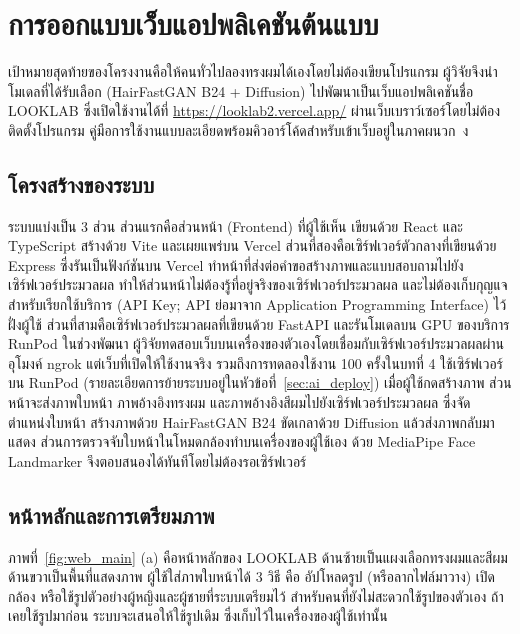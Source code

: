 \section{การออกแบบเว็บแอปพลิเคชันต้นแบบ}
\label{sec:webapp}

เป้าหมายสุดท้ายของโครงงานคือให้คนทั่วไปลองทรงผมได้เองโดยไม่ต้องเขียนโปรแกรม
ผู้วิจัยจึงนำโมเดลที่ได้รับเลือก (HairFastGAN B24 + Diffusion) ไปพัฒนาเป็นเว็บแอปพลิเคชันชื่อ LOOKLAB
ซึ่งเปิดใช้งานได้ที่ \url{https://looklab2.vercel.app/} ผ่านเว็บเบราว์เซอร์โดยไม่ต้องติดตั้งโปรแกรม
คู่มือการใช้งานแบบละเอียดพร้อมคิวอาร์โค้ดสำหรับเข้าเว็บอยู่ในภาคผนวก~ง

\subsection{โครงสร้างของระบบ}

ระบบแบ่งเป็น 3 ส่วน ส่วนแรกคือส่วนหน้า (Frontend) ที่ผู้ใช้เห็น
เขียนด้วย React และ TypeScript สร้างด้วย Vite และเผยแพร่บน Vercel
ส่วนที่สองคือเซิร์ฟเวอร์ตัวกลางที่เขียนด้วย Express ซึ่งรันเป็นฟังก์ชันบน Vercel
ทำหน้าที่ส่งต่อคำขอสร้างภาพและแบบสอบถามไปยังเซิร์ฟเวอร์ประมวลผล
ทำให้ส่วนหน้าไม่ต้องรู้ที่อยู่จริงของเซิร์ฟเวอร์ประมวลผล
และไม่ต้องเก็บกุญแจสำหรับเรียกใช้บริการ (API Key; API ย่อมาจาก Application Programming Interface) ไว้ฝั่งผู้ใช้
ส่วนที่สามคือเซิร์ฟเวอร์ประมวลผลที่เขียนด้วย FastAPI และรันโมเดลบน GPU ของบริการ RunPod
ในช่วงพัฒนา ผู้วิจัยทดสอบเว็บบนเครื่องของตัวเองโดยเชื่อมกับเซิร์ฟเวอร์ประมวลผลผ่านอุโมงค์ ngrok
แต่เว็บที่เปิดให้ใช้งานจริง รวมถึงการทดลองใช้งาน 100 ครั้งในบทที่ 4 ใช้เซิร์ฟเวอร์บน RunPod
(รายละเอียดการย้ายระบบอยู่ในหัวข้อที่~\ref{sec:ai_deploy})
เมื่อผู้ใช้กดสร้างภาพ ส่วนหน้าจะส่งภาพใบหน้า ภาพอ้างอิงทรงผม และภาพอ้างอิงสีผมไปยังเซิร์ฟเวอร์ประมวลผล
ซึ่งจัดตำแหน่งใบหน้า สร้างภาพด้วย HairFastGAN B24 ขัดเกลาด้วย Diffusion แล้วส่งภาพกลับมาแสดง
ส่วนการตรวจจับใบหน้าในโหมดกล้องทำบนเครื่องของผู้ใช้เอง ด้วย MediaPipe Face Landmarker
จึงตอบสนองได้ทันทีโดยไม่ต้องรอเซิร์ฟเวอร์

\subsection{หน้าหลักและการเตรียมภาพ}

ภาพที่~\ref{fig:web_main} (a) คือหน้าหลักของ LOOKLAB ด้านซ้ายเป็นแผงเลือกทรงผมและสีผม
ด้านขวาเป็นพื้นที่แสดงภาพ ผู้ใช้ใส่ภาพใบหน้าได้ 3 วิธี คือ อัปโหลดรูป (หรือลากไฟล์มาวาง)
เปิดกล้อง หรือใช้รูปตัวอย่างผู้หญิงและผู้ชายที่ระบบเตรียมไว้ สำหรับคนที่ยังไม่สะดวกใช้รูปของตัวเอง
ถ้าเคยใช้รูปมาก่อน ระบบจะเสนอให้ใช้รูปเดิม ซึ่งเก็บไว้ในเครื่องของผู้ใช้เท่านั้น

